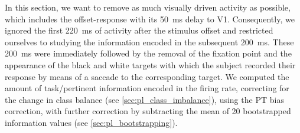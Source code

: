 In this section, we want to remove as much visually driven activity as possible, which includes the offset-response with its \SI{50}{\milli\second} delay to \ac{V1}.
Consequently, we ignored the first \SI{220}{\milli\second} of activity after the stimulus offset and restricted ourselves to studying the information encoded in the subsequent \SI{200}{\milli\second}.
These \SI{200}{\milli\second} were immediately followed by the removal of the fixation point and the appearance of the black and white targets with which the subject recorded their response by means of a saccade to the corresponding target.
We computed the amount of task\-/pertinent information encoded in the firing rate, correcting for the change in class balance (see \autoref{sec:pl_class_imbalance}), using the \ac{PT} bias correction, with further correction by subtracting the mean of \num{20} bootstrapped information values (see \autoref{sec:pl_bootstrapping}).

